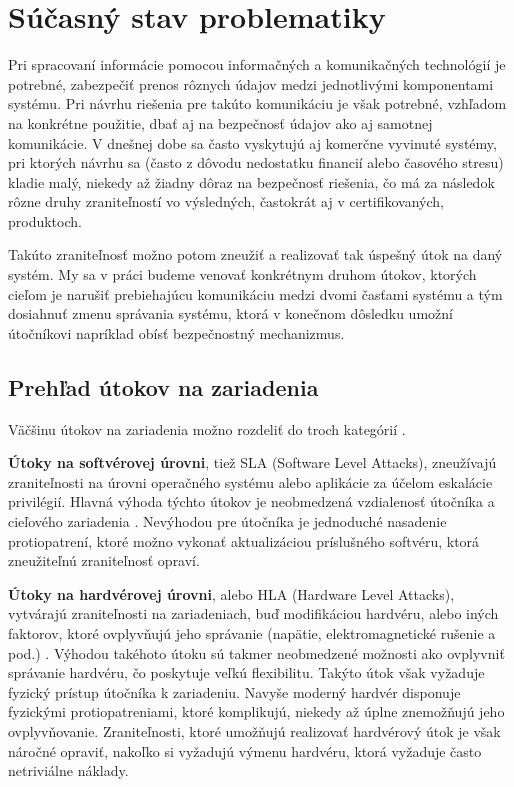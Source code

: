 \chapter{Súčasný stav problematiky}
\label{kap:stav}

Pri spracovaní informácie pomocou informačných a komunikačných technológií je potrebné, zabezpečiť prenos rôznych údajov medzi jednotlivými komponentami systému. Pri návrhu riešenia pre takúto komunikáciu je však potrebné, vzhľadom na konkrétne použitie, dbať aj na bezpečnosť údajov ako aj samotnej komunikácie. V dnešnej dobe sa často vyskytujú aj komerčne vyvinuté systémy, pri ktorých návrhu sa (často z dôvodu nedostatku financií alebo časového stresu) kladie malý, niekedy až žiadny dôraz na bezpečnosť riešenia, čo má za následok rôzne druhy zraniteľností vo výsledných, častokrát aj v certifikovaných, produktoch.

Takúto zraniteľnosť možno potom zneužiť a realizovať tak úspešný útok na daný systém. My sa v práci budeme venovať konkrétnym druhom útokov, ktorých cieľom je narušiť prebiehajúcu komunikáciu medzi dvomi časťami systému a tým dosiahnuť zmenu správania systému, ktorá v konečnom dôsledku umožní útočníkovi napríklad obísť bezpečnostný mechanizmus.

\section{Prehľad útokov na zariadenia}
Väčšinu útokov na zariadenia možno rozdeliť do troch kategórií \cite{mitmPCIe}.

\textbf{Útoky na softvérovej úrovni}, tiež SLA (Software Level Attacks), zneužívajú zraniteľnosti na úrovni operačného systému alebo aplikácie za účelom eskalácie privilégií. Hlavná výhoda týchto útokov je neobmedzená vzdialenosť útočníka a cieľového zariadenia \cite{mitmPCIe}. Nevýhodou pre útočníka je jednoduché nasadenie protiopatrení, ktoré možno vykonať aktualizáciou príslušného softvéru, ktorá zneužiteľnú zraniteľnosť opraví.

\textbf{Útoky na hardvérovej úrovni}, alebo HLA (Hardware Level Attacks), vytvárajú zraniteľnosti na zariadeniach, buď modifikáciou hardvéru, alebo iných faktorov, ktoré ovplyvňujú jeho správanie (napätie, elektromagnetické rušenie a pod.) \cite{mitmPCIe}. Výhodou takéhoto útoku sú takmer neobmedzené možnosti ako ovplyvniť správanie hardvéru, čo poskytuje veľkú flexibilitu. Takýto útok však vyžaduje fyzický prístup útočníka k zariadeniu. Navyše moderný hardvér disponuje fyzickými protiopatreniami, ktoré komplikujú, niekedy až úplne znemožňujú jeho ovplyvňovanie. Zraniteľnosti, ktoré umožňujú realizovať hardvérový útok je však náročné opraviť, nakoľko si vyžadujú výmenu hardvéru, ktorá vyžaduje často netriviálne náklady.

